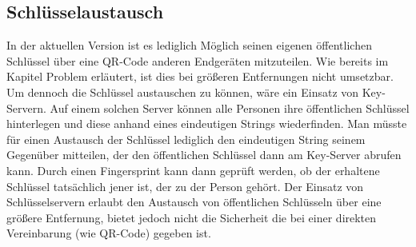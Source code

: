 \documentclass[10pt, a4paper]{scrreprt}
\begin{document}
\subsection{Schlüsselaustausch}
In der aktuellen Version ist es lediglich Möglich seinen eigenen öffentlichen Schlüssel über eine QR-Code anderen Endgeräten mitzuteilen. Wie bereits im Kapitel Problem erläutert, ist dies bei größeren Entfernungen nicht umsetzbar. Um dennoch die Schlüssel austauschen zu können, wäre ein Einsatz von Key-Servern. Auf einem solchen Server können alle Personen ihre öffentlichen Schlüssel hinterlegen und diese anhand eines eindeutigen Strings wiederfinden. Man müsste für einen Austausch der Schlüssel lediglich den eindeutigen String seinem Gegenüber mitteilen, der den öffentlichen Schlüssel dann am Key-Server abrufen kann. Durch einen Fingersprint kann dann geprüft werden, ob der erhaltene Schlüssel tatsächlich jener ist, der zu der Person gehört. Der Einsatz von Schlüsselservern erlaubt den Austausch von öffentlichen Schlüsseln über eine größere Entfernung, bietet jedoch nicht die Sicherheit die bei einer direkten Vereinbarung (wie QR-Code) gegeben ist.








\printindex


\end{document}
